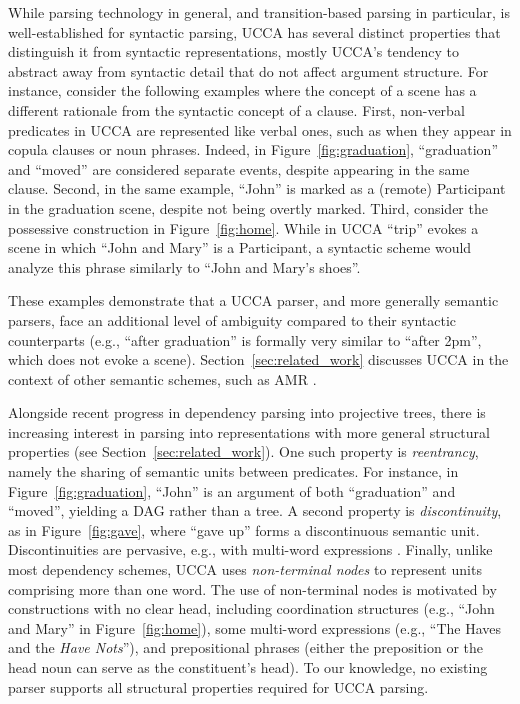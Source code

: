 \documentclass[11pt,a4paper]{article}
\newcommand{\secref}[1]{Section~\ref{#1}}
\newcommand{\figref}[1]{Figure~\ref{#1}}
\begin{document}
While parsing technology in general, and transition-based parsing in particular,
is well-established for syntactic parsing, UCCA
has several distinct properties
that distinguish it from syntactic representations,
mostly UCCA's tendency to abstract away from syntactic detail that do not
affect argument structure.
For instance, consider the following examples where the concept of a scene
has a different rationale from the syntactic concept of a clause.
First, non-verbal predicates in UCCA are represented like verbal ones,
such as when they appear in copula clauses or noun phrases. Indeed,
in \figref{fig:graduation}, ``graduation'' and ``moved'' are considered separate events,
despite appearing in the same clause. 
Second, in the same example, ``John'' is marked as a (remote) Participant
in the graduation scene, despite not being overtly marked.
Third, consider the possessive construction in \figref{fig:home}.
While in UCCA ``trip'' evokes a scene in which ``John and Mary'' is
a Participant, a syntactic scheme would analyze this phrase similarly to ``John and Mary's shoes''.

These examples demonstrate that a UCCA parser, and more generally semantic parsers,
face an additional level of ambiguity compared to their syntactic counterparts
(e.g., ``after graduation'' is formally very similar to ``after 2pm'',
which does not evoke a scene).
\secref{sec:related_work} discusses UCCA in the context of other semantic schemes,
such as AMR \cite{banarescu2013abstract}.


Alongside recent progress in dependency parsing into projective trees,
there is increasing interest in parsing into 
representations with more general structural properties  (see \secref{sec:related_work}).
One such property is \textit{reentrancy},
namely the sharing of semantic units between predicates.
For instance, in \figref{fig:graduation},
``John'' is an argument of both ``graduation''
and ``moved'', yielding a DAG rather than a tree.
A second property is \textit{discontinuity},
as in \figref{fig:gave}, where ``gave up'' forms a discontinuous semantic unit.
Discontinuities are pervasive, e.g.,  with multi-word
expressions \cite{schneider2014discriminative}.
Finally, unlike most dependency schemes, UCCA uses \textit{non-terminal nodes}
to represent units comprising more than one word.
The use of non-terminal nodes is motivated by constructions with no clear head, including
coordination structures (e.g., ``John and Mary'' in \figref{fig:home}),
some multi-word expressions (e.g., ``The Haves and the \textit{Have Nots}''),
and prepositional phrases (either the preposition or the head noun can serve as the constituent's head).
To our knowledge, no existing parser supports all structural properties required for UCCA
parsing.
\end{document}
